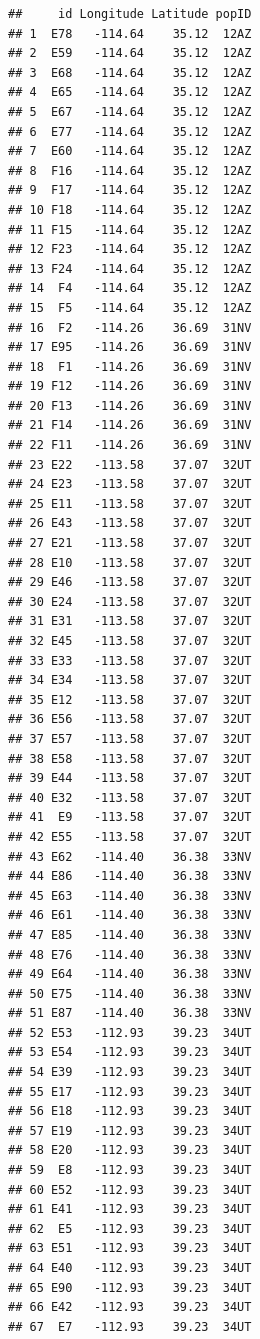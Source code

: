 \documentclass[]{article}
\newenvironment{Shaded}{\begin{snugshade}}{\end{snugshade}}
\newcommand{\KeywordTok}[1]{\textcolor[rgb]{0.13,0.29,0.53}{\textbf{#1}}}
\newcommand{\OperatorTok}[1]{\textcolor[rgb]{0.81,0.36,0.00}{\textbf{#1}}}
\newcommand{\NormalTok}[1]{#1}
\begin{document}
\begin{verbatim}
##     id Longitude Latitude popID
## 1  E78   -114.64    35.12  12AZ
## 2  E59   -114.64    35.12  12AZ
## 3  E68   -114.64    35.12  12AZ
## 4  E65   -114.64    35.12  12AZ
## 5  E67   -114.64    35.12  12AZ
## 6  E77   -114.64    35.12  12AZ
## 7  E60   -114.64    35.12  12AZ
## 8  F16   -114.64    35.12  12AZ
## 9  F17   -114.64    35.12  12AZ
## 10 F18   -114.64    35.12  12AZ
## 11 F15   -114.64    35.12  12AZ
## 12 F23   -114.64    35.12  12AZ
## 13 F24   -114.64    35.12  12AZ
## 14  F4   -114.64    35.12  12AZ
## 15  F5   -114.64    35.12  12AZ
## 16  F2   -114.26    36.69  31NV
## 17 E95   -114.26    36.69  31NV
## 18  F1   -114.26    36.69  31NV
## 19 F12   -114.26    36.69  31NV
## 20 F13   -114.26    36.69  31NV
## 21 F14   -114.26    36.69  31NV
## 22 F11   -114.26    36.69  31NV
## 23 E22   -113.58    37.07  32UT
## 24 E23   -113.58    37.07  32UT
## 25 E11   -113.58    37.07  32UT
## 26 E43   -113.58    37.07  32UT
## 27 E21   -113.58    37.07  32UT
## 28 E10   -113.58    37.07  32UT
## 29 E46   -113.58    37.07  32UT
## 30 E24   -113.58    37.07  32UT
## 31 E31   -113.58    37.07  32UT
## 32 E45   -113.58    37.07  32UT
## 33 E33   -113.58    37.07  32UT
## 34 E34   -113.58    37.07  32UT
## 35 E12   -113.58    37.07  32UT
## 36 E56   -113.58    37.07  32UT
## 37 E57   -113.58    37.07  32UT
## 38 E58   -113.58    37.07  32UT
## 39 E44   -113.58    37.07  32UT
## 40 E32   -113.58    37.07  32UT
## 41  E9   -113.58    37.07  32UT
## 42 E55   -113.58    37.07  32UT
## 43 E62   -114.40    36.38  33NV
## 44 E86   -114.40    36.38  33NV
## 45 E63   -114.40    36.38  33NV
## 46 E61   -114.40    36.38  33NV
## 47 E85   -114.40    36.38  33NV
## 48 E76   -114.40    36.38  33NV
## 49 E64   -114.40    36.38  33NV
## 50 E75   -114.40    36.38  33NV
## 51 E87   -114.40    36.38  33NV
## 52 E53   -112.93    39.23  34UT
## 53 E54   -112.93    39.23  34UT
## 54 E39   -112.93    39.23  34UT
## 55 E17   -112.93    39.23  34UT
## 56 E18   -112.93    39.23  34UT
## 57 E19   -112.93    39.23  34UT
## 58 E20   -112.93    39.23  34UT
## 59  E8   -112.93    39.23  34UT
## 60 E52   -112.93    39.23  34UT
## 61 E41   -112.93    39.23  34UT
## 62  E5   -112.93    39.23  34UT
## 63 E51   -112.93    39.23  34UT
## 64 E40   -112.93    39.23  34UT
## 65 E90   -112.93    39.23  34UT
## 66 E42   -112.93    39.23  34UT
## 67  E7   -112.93    39.23  34UT
\end{verbatim}

\begin{Shaded}
\end{Shaded}
\end{document}

